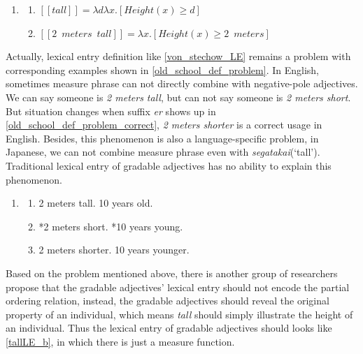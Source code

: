 \documentclass{ctexart}
\begin{document}
\begin{enumerate}
    \item \label{old_school_def_example_LE}
    \begin{enumerate}
        \item $[\![tall]\!]=\lambda d \lambda x.[Height(x) \geq d]$
        \item $[\![2 \enspace meters \enspace tall]\!]=\lambda x.[Height(x) \geq 2 \enspace meters]$
    \end{enumerate}
\end{enumerate}

Actually, lexical entry definition like \ref{von_stechow_LE} remains a problem with corresponding examples shown in \ref{old_school_def_problem}. In English, sometimes measure phrase can not directly combine with negative-pole adjectives. We can say someone is \textit{2 meters tall}, but can not say someone is \textit{2 meters short}. But situation changes when suffix \textit{er} shows up in \ref{old_school_def_problem_correct}, \textit{2 meters shorter} is a correct usage in English. Besides, this phenomenon is also a language-specific problem, in Japanese, we can not combine measure phrase even with \textit{segatakai}(`tall'). Traditional lexical entry of gradable adjectives has no ability to explain this phenomenon.

\begin{enumerate}

    \item \label{old_school_def_problem}
    
    \begin{enumerate}
        
        \item 2 meters tall. 10 years old.
        \item *2 meters short. *10 years young.
        \item \label{old_school_def_problem_correct} 2 meters shorter. 10 years younger.

    \end{enumerate}

\end{enumerate}

Based on the problem mentioned above, there is another group of researchers propose that the gradable adjectives' lexical entry should not encode the partial ordering relation, instead, the gradable adjectives should reveal the original property of an individual, which means \textit{tall} should simply illustrate the height of an individual. Thus the lexical entry of gradable adjectives should looks like \ref{tallLE_b}, in which there is just a measure function. 
\end{document}

